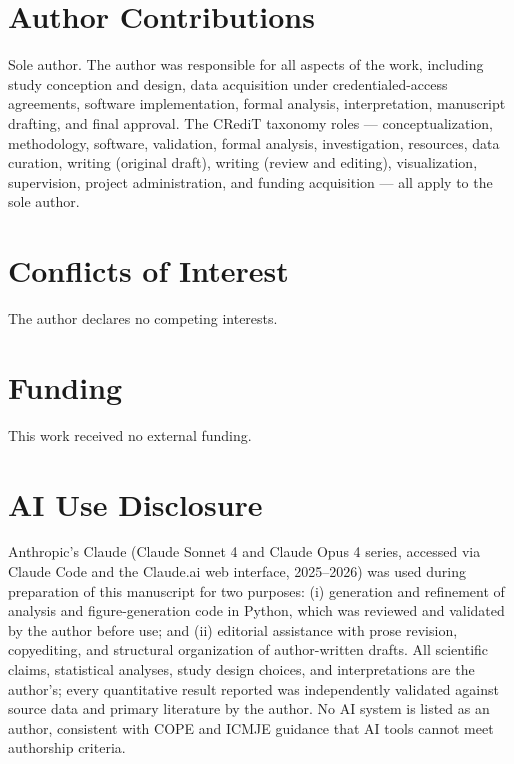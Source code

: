 \section*{Author Contributions}
Sole author. The author was responsible for all aspects of the work, including study conception and design, data acquisition under credentialed-access agreements, software implementation, formal analysis, interpretation, manuscript drafting, and final approval. The CRediT taxonomy roles --- conceptualization, methodology, software, validation, formal analysis, investigation, resources, data curation, writing (original draft), writing (review and editing), visualization, supervision, project administration, and funding acquisition --- all apply to the sole author.

\section*{Conflicts of Interest}
The author declares no competing interests.

\section*{Funding}
This work received no external funding.

\section*{AI Use Disclosure}
Anthropic's Claude (Claude Sonnet 4 and Claude Opus 4 series, accessed via Claude Code and the Claude.ai web interface, 2025--2026) was used during preparation of this manuscript for two purposes: (i) generation and refinement of analysis and figure-generation code in Python, which was reviewed and validated by the author before use; and (ii) editorial assistance with prose revision, copyediting, and structural organization of author-written drafts. All scientific claims, statistical analyses, study design choices, and interpretations are the author's; every quantitative result reported was independently validated against source data and primary literature by the author. No AI system is listed as an author, consistent with COPE and ICMJE guidance that AI tools cannot meet authorship criteria.

